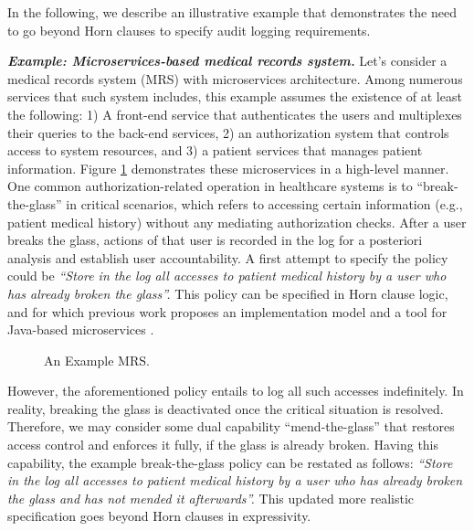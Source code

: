 In the following, we describe an illustrative example that demonstrates the need to go beyond Horn clauses to specify audit logging requirements.

\textbf{\textit{Example: Microservices-based medical records system.}}
Let's consider a medical records system (MRS) with microservices architecture. Among numerous services that such system includes, this example assumes the existence of at least the following: 1) A front-end service that authenticates the users and multiplexes their queries to the back-end services,  2) an authorization system that controls access to system resources, and 3) a patient services that manages patient information. Figure \ref{fig:mrs-mics} demonstrates these microservices in a high-level manner. One common authorization-related operation in healthcare systems is to ``break-the-glass'' \cite{matthews-gaebel-hie09} in critical scenarios, which refers to accessing certain information (e.g., patient medical history) without any mediating authorization checks. After a user breaks the glass, actions of that user is recorded in the log for a posteriori analysis and establish user accountability.  A first attempt to specify the policy could be \emph{``Store in the log all accesses to patient medical history by a user who has already broken the glass''.}  This policy can be specified in Horn clause logic, and for which previous work proposes an implementation model \cite{lsfa20} and a tool for Java-based  microservices \cite{stpsa21}.  

\begin{figure} 
	\centering
	\caption{An Example MRS.}
	\label{fig:mrs-mics}
\end{figure}

However, the aforementioned policy entails to log all such accesses indefinitely. In reality, breaking the glass is deactivated once the critical situation is resolved. Therefore, we may consider some dual capability ``mend-the-glass'' that restores access control and enforces it fully, if the glass is already broken. Having this capability, the example break-the-glass policy can be restated as follows: \emph{``Store in the log all accesses to patient medical history by a user who has already broken the glass and has not mended it afterwards''.}  This updated more realistic specification goes beyond Horn clauses in expressivity.

